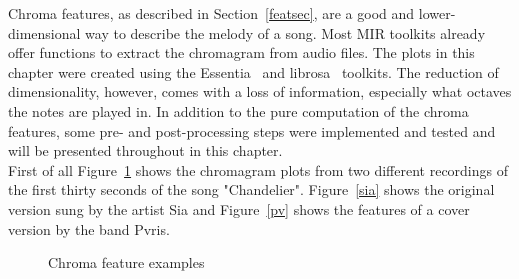 Chroma features, as described in Section~\ref{featsec}, are a good and lower-dimensional way to describe the melody of a song. Most MIR toolkits already offer functions to extract the chromagram from audio files. The plots in this chapter were created using the Essentia~\cite{essentia1} and librosa~\cite{librosa1} toolkits. 
The reduction of dimensionality, however, comes with a loss of information, especially what octaves the notes are played in. In addition to the pure computation of the chroma features, some pre- and post-processing steps were implemented and tested and will be presented throughout in this chapter.\\
First of all Figure~\ref{fig:chroma1} shows the chromagram plots from two different recordings of the first thirty seconds of the song "Chandelier". Figure~\ref{sia} shows the original version sung by the artist Sia and Figure~\ref{pv} shows the features of a cover version by the band Pvris. 
\begin{figure}[htbp]
	\centering
	\caption{Chroma feature examples}
	\label{fig:chroma1}
\end{figure}
